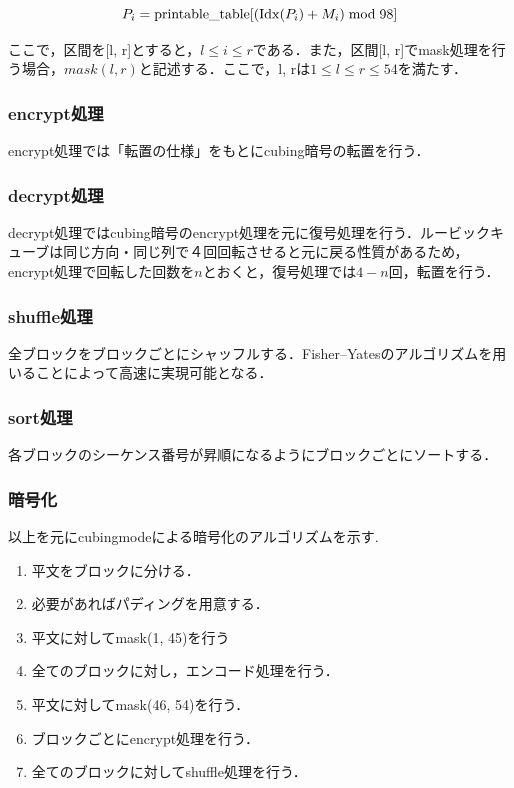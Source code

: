 \documentclass[titlepage]{jarticle}
\begin{document}
\[P_i=\mathrm{printable\_table}[(\mathrm{Idx}(P_i)+M_i) \bmod 98]\\\]

ここで，区間を[l, r]とすると，\(l\leq i \leq r\)である．また，区間[l, r]でmask処理を行う場合，\(mask(l, r)\)と記述する．ここで，l, rは\(1 \leq l \leq r \leq 54\)を満たす．

\subsubsection{encrypt処理}
encrypt処理では「転置の仕様」をもとにcubing暗号の転置を行う．

\subsubsection{decrypt処理}
decrypt処理ではcubing暗号のencrypt処理を元に復号処理を行う．ルービックキューブは同じ方向・同じ列で４回回転させると元に戻る性質があるため，encrypt処理で回転した回数を\(n\)とおくと，復号処理では\(4-n\)回，転置を行う．

\subsubsection{shuffle処理}
全ブロックをブロックごとにシャッフルする．Fisher–Yatesのアルゴリズムを用いることによって高速に実現可能となる．

\subsubsection{sort処理}
各ブロックのシーケンス番号が昇順になるようにブロックごとにソートする．

\subsubsection{暗号化}
以上を元にcubingmodeによる暗号化のアルゴリズムを示す. 
\begin{enumerate}
\item 平文をブロックに分ける．
\item 必要があればパディングを用意する．
\item 平文に対してmask(1, 45)を行う
\item 全てのブロックに対し，エンコード処理を行う．
\item 平文に対してmask(46, 54)を行う．
\item ブロックごとにencrypt処理を行う．
\item 全てのブロックに対してshuffle処理を行う．
\end{enumerate}
\end{document}
